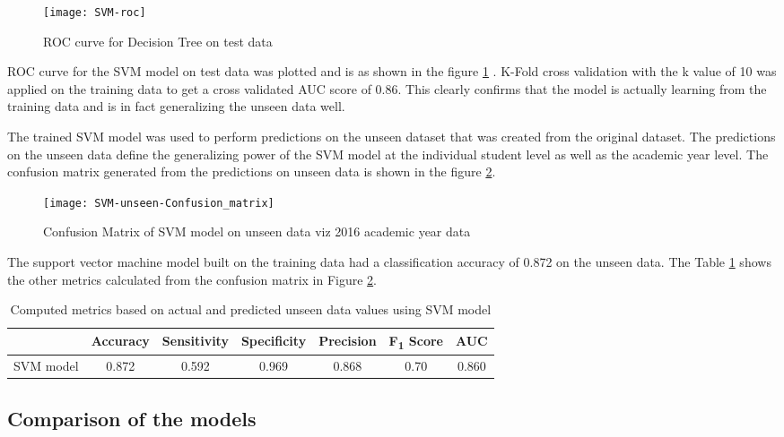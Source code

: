 \documentclass[11pt,openright]{report}
\begin{document}
 \begin{figure}[!htb]
	\centering
	\texttt{[image: SVM-roc]}
	\caption{ROC curve for Decision Tree on test data}
	\label{fig:SVM_roc}
\end{figure} 

ROC curve for the SVM model on test data was plotted and is as shown in the figure \ref{fig:SVM_roc} . K-Fold cross validation with the k value of 10 was applied on the training data to get a cross validated AUC score of 0.86. This clearly confirms that the model is actually learning from the training data and is in fact generalizing the unseen data well.

The trained SVM model was used to perform predictions on the unseen dataset that was created from the original dataset. The predictions on the unseen data define the generalizing power of the SVM model at the individual student level as well as the academic year level. The confusion matrix generated from the predictions on unseen data is shown in the figure \ref{fig:SVM_unseen_confusion_matrix}.

  \begin{figure}[!htb]
	\centering
	\texttt{[image: SVM-unseen-Confusion\_matrix]}
	\caption{Confusion Matrix of SVM model on unseen data viz 2016 academic year data}
	\label{fig:SVM_unseen_confusion_matrix}
\end{figure} 


The support vector machine model built on the training data had a classification accuracy of 0.872 on the unseen data. The Table \ref{table:SVM-unseen_metrics_db} shows the other metrics calculated from the confusion matrix in Figure \ref{fig:SVM_unseen_confusion_matrix}.

\begin{table}[!htb]
	\renewcommand{\arraystretch}{1.3}
	\caption{Computed metrics based on actual and predicted unseen data values using SVM model}
	\label{table:SVM-unseen_metrics_db}
	\centering
	\begin{tabular}{|c|c|c|c|c|c|c|}
    \hline
  	 & \bfseries Accuracy & \bfseries Sensitivity & \bfseries Specificity & \bfseries Precision & \bfseries F\textsubscript{1} Score  & \bfseries AUC\\  
    \hline
	SVM model & 0.872 & 0.592 & 0.969 & 0.868 & 0.70 & 0.860 \\ \hline
	\end{tabular} 
\end{table}


\subsection {Comparison of the models}
\end{document}
